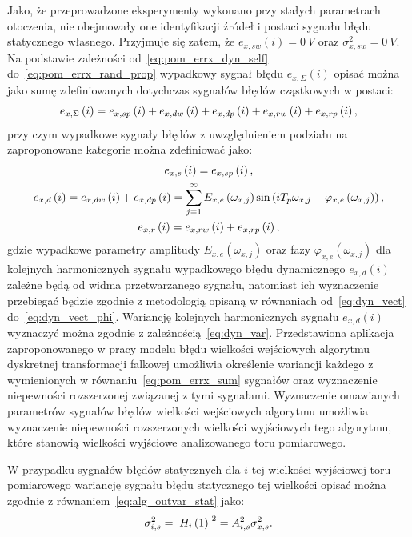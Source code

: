 Jako, że przeprowadzone eksperymenty wykonano przy stałych parametrach otoczenia, nie obejmowały one identyfikacji źródeł i postaci sygnału błędu statycznego własnego. Przyjmuje się zatem, że $e_{x,sw}(i) = \qty{0}{V}$ oraz $\sigma_{x,sw}^{2} = \qty{0}{V}$. Na podstawie zależności od~\eqref{eq:pom_errx_dyn_self} do~\eqref{eq:pom_errx_rand_prop} wypadkowy sygnał błędu $e_{x,\Sigma}(i)$ opisać można jako sumę zdefiniowanych dotychczas sygnałów błędów cząstkowych w postaci:
\begin{equation}
e_{x,\Sigma} \left(i\right) = e_{x,sp} \left(i\right) + e_{x,dw} \left(i\right) + e_{x,dp} \left(i\right) + e_{x,rw} \left(i\right) + e_{x,rp} \left(i\right) \label{eq:pom_errx_sum},
\end{equation}
przy czym wypadkowe sygnały błędów z uwzględnieniem podziału na zaproponowane kategorie można zdefiniować jako:
\begin{gather}
e_{x,s} \left(i\right) = e_{x,sp} \left(i\right) \label{eq:pom_errx_stat}, \\
e_{x,d} \left(i\right) = e_{x,dw} \left(i\right) + e_{x,dp} \left(i\right) = \sum _{j=1} ^{\infty} E_{x,e} \left(\omega_{x,j}\right) \sin \left(i T_{p} \omega_{x,j} + \varphi_{x,e} \left(\omega_{x,j}\right)\right) \label{eq:pom_errx_dyn}, \\
e_{x,r} \left(i\right) = e_{x,rw} \left(i\right) + e_{x,rp} \left(i\right) \label{eq:pom_errx_rand},
\end{gather}
gdzie wypadkowe parametry amplitudy $E_{x,e}(\omega_{x,j})$ oraz fazy $\varphi_{x,e}(\omega_{x,j})$ dla kolejnych harmonicznych sygnału wypadkowego błędu dynamicznego $e_{x,d}(i)$ zależne będą od widma przetwarzanego sygnału, natomiast ich wyznaczenie przebiegać będzie zgodnie z metodologią opisaną w równaniach od~\eqref{eq:dyn_vect} do~\eqref{eq:dyn_vect_phi}. Wariancję kolejnych harmonicznych sygnału $e_{x,d}(i)$ wyznaczyć można zgodnie z zależnością~\eqref{eq:dyn_var}. Przedstawiona aplikacja zaproponowanego w pracy modelu błędu wielkości wejściowych algorytmu dyskretnej transformacji falkowej umożliwia określenie wariancji każdego z wymienionych w równaniu~\eqref{eq:pom_errx_sum} sygnałów oraz wyznaczenie niepewności rozszerzonej związanej z tymi sygnałami. Wyznaczenie omawianych parametrów sygnałów błędów wielkości wejściowych algorytmu umożliwia wyznaczenie niepewności rozszerzonych wielkości wyjściowych tego algorytmu, które stanowią wielkości wyjściowe analizowanego toru pomiarowego.

W przypadku sygnałów błędów statycznych dla $i$-tej wielkości wyjściowej toru pomiarowego wariancję sygnału błędu statycznego tej wielkości opisać można zgodnie z równaniem~\eqref{eq:alg_outvar_stat} jako:
\begin{equation}
\sigma_{i,s}^{2} = \left| H_{i} \left(1\right) \right|^{2} = A_{i,s}^{2} \sigma_{x,s}^{2} \label{eq:pom_varout_stat}.
\end{equation}

